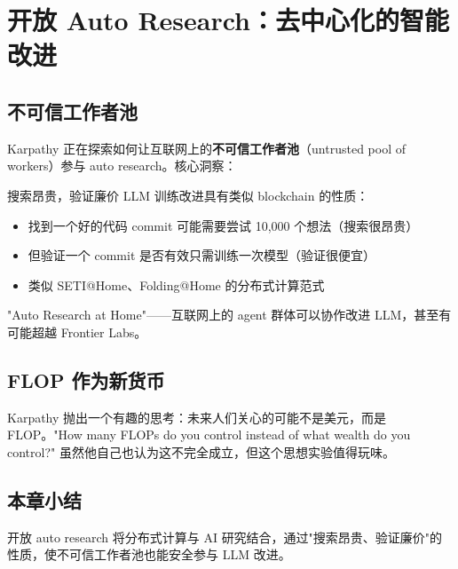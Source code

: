 \section{开放 Auto Research：去中心化的智能改进}

\subsection{不可信工作者池}

Karpathy 正在探索如何让互联网上的\textbf{不可信工作者池}（untrusted pool of workers）参与 auto research。核心洞察：

\begin{importantbox}{搜索昂贵，验证廉价}
LLM 训练改进具有类似 blockchain 的性质：
\begin{itemize}
    \item 找到一个好的代码 commit 可能需要尝试 10,000 个想法（搜索很昂贵）
    \item 但验证一个 commit 是否有效只需训练一次模型（验证很便宜）
    \item 类似 SETI@Home、Folding@Home 的分布式计算范式
\end{itemize}
"Auto Research at Home"——互联网上的 agent 群体可以协作改进 LLM，甚至有可能超越 Frontier Labs。
\end{importantbox}

\subsection{FLOP 作为新货币}

Karpathy 抛出一个有趣的思考：未来人们关心的可能不是美元，而是 FLOP。"How many FLOPs do you control instead of what wealth do you control?" 虽然他自己也认为这不完全成立，但这个思想实验值得玩味。

\subsection{本章小结}

开放 auto research 将分布式计算与 AI 研究结合，通过"搜索昂贵、验证廉价"的性质，使不可信工作者池也能安全参与 LLM 改进。



